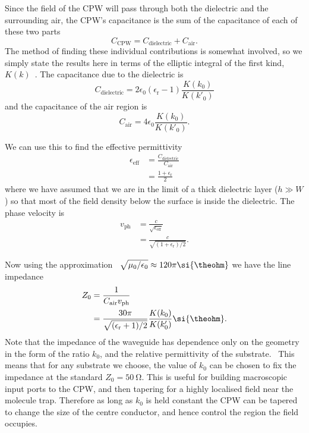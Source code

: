 Since the field of the CPW will pass through both the dielectric and the
surrounding air, the CPW's capacitance is the sum of the capacitance of each of
these two parts
%
\begin{equation}
  C_\text{CPW} = C_\text{dielectric} + C_\text{air}.
\end{equation}
%
The method of finding these individual contributions is somewhat involved, so
we simply state the results here in terms of the elliptic integral of the
first kind, $K(k)$~\cite{Simons2004}. The capacitance due to the dielectric is
%
%
\begin{equation}
  C_\text{dielectric} = 2\epsilon_0(\epsilon_\text{r}-1)\frac{K(k_0)}{K(k'_0)}
\end{equation}
%
and the capacitance of the air region is
%
\begin{equation}
  C_\text{air} = 4\epsilon_0 \frac{K(k_0)}{K(k'_0)}.
\end{equation}

We can use this to find the effective permittivity~\cite{Simons2004}
%
\begin{align}
  \epsilon_\text{eff} &= \frac{C_\text{dielectric}}{C_\text{air}} \\
    &= \frac{1+ \epsilon_\text{r}}{2}
\end{align}
%
where we have assumed that we are in the limit of a thick dielectric layer ($h
\gg W$) so that most of the field density below the surface is inside the
dielectric.
%
The phase velocity  is~\cite{Simons2004}
%
\begin{align}
  v_\text{ph} &= \frac{c}{\sqrt{\epsilon_\text{eff}}} \\
    &= \frac{c}{\sqrt{(1 + \epsilon_\text{r})/2}}.
\end{align}

Now using the approximation~\cite{Collin2007}
$\sqrt{\mu_0/\epsilon_0}\approx120\pi\si{\theohm}$ we have the line
impedance~\cite{Simons2004}
\begin{align}
  Z_0 &= \frac{1}{C_\text{air} v_\text{ph}} \\
    &= \frac{30 \pi}{\sqrt{(\epsilon_\text{r}+1)/2}} \frac{K(k_0)}{K(k'_0)}
    \si{\theohm}.
    \label{mws:eqn:Z0}
\end{align}
Note that the impedance of the waveguide has dependence only on the geometry in
the form of the ratio $k_0$, and the relative permittivity of the
substrate.~\cite{Simons2004} This means that for any substrate we choose, the
value of $k_0$ can be chosen to fix the impedance at the standard $Z_0 =
\SI{50}{\ohm}$. This is useful for building macroscopic input ports to the CPW,
and then tapering for a highly localised field near the molecule trap.
%
Therefore as long as $k_0$ is held constant the CPW can be tapered to change the
size of the centre conductor, and hence control the region the field occupies.


